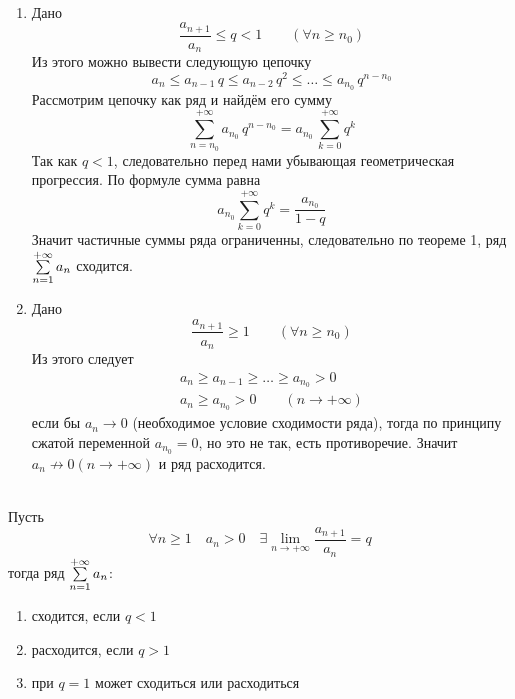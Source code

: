 \begin{Proof}~
	\begin{enumerate}
		\item Дано 
        \[
            \frac{a_{n+1}}{a_n} \leqslant q < 1 \qquad (\forall n \geqslant n_0)
        \]
        Из этого можно вывести следующую цепочку
        \[
            a_n \leqslant a_{n-1}\,q \leqslant a_{n-2}\,q^2 \leqslant \dots \leqslant a_{n_0}\,q^{n-n_0}
        \]
        Рассмотрим цепочку как ряд и найдём его сумму
        \[
            \sum_{n=n_0}^{+\infty}a_{n_0}\,q^{n-n_0} = a_{n_0}\,\sum_{k = 0}^{+\infty}q^k
        \]
        Так как $q < 1$, следовательно перед нами убывающая геометрическая прогрессия. По формуле сумма равна
        \[
		  a_{n_0}\sum_{k = 0}^{+\infty}q^k = \frac{a_{n_0}}{1-q}
        \]
        Значит частичные суммы ряда ограниченны,  следовательно по теореме 1, ряд $\sum\limits_{n = 1}^{+\infty}{a_n}$ сходится.
        
		\item Дано 
        \[
            \frac{a_{n+1}}{a_n} \geqslant 1 \qquad (\forall n \geqslant n_0)
        \]
        Из этого следует
        \begin{gather*}
            a_n \geqslant a_{n-1} \geqslant \dots \geqslant a_{n_0} > 0\\
            a_n \geq a_{n_0} > 0 \qquad (n \to +\infty)
        \end{gather*}
        если бы $a_n \to 0$ (необходимое условие сходимости ряда), тогда по принципу сжатой переменной $a_{n_0} = 0$, но это не так, есть противоречие. Значит $a_n \nrightarrow 0 (n \to +\infty)$ и ряд расходится.
	\end{enumerate}
\end{Proof}

\begin{Th} ~\\
	Пусть 
    \[
        \forall n \geqslant 1 \quad a_n > 0 \quad \exists \lim_{n \to +\infty}\frac{a_{n+1}}{a_n} = q
    \]
    тогда ряд $\sum\limits_{n = 1}^{+\infty}{a_n}$:
	\begin{enumerate}
		\item сходится, если $q < 1$
		\item расходится, если $q > 1$
		\item при $q = 1$ может сходиться или расходиться
	\end{enumerate}
\end{Th}

